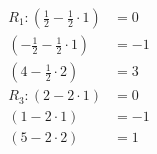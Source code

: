 \documentclass[preview]{standalone}
\begin{document}
\begin{align*}
R_1: (\frac{1}{2} - \frac{1}{2}\cdot1) & = 0 \\ (-\frac{1}{2} - \frac{1}{2}\cdot1) & = -1 \\ (4 - \frac{1}{2}\cdot2) & = 3 \\ R_3: (2 - 2\cdot1) & = 0 \\ (1 - 2\cdot1) & = -1 \\ (5 - 2\cdot2) & = 1
\end{align*}
\end{document}
